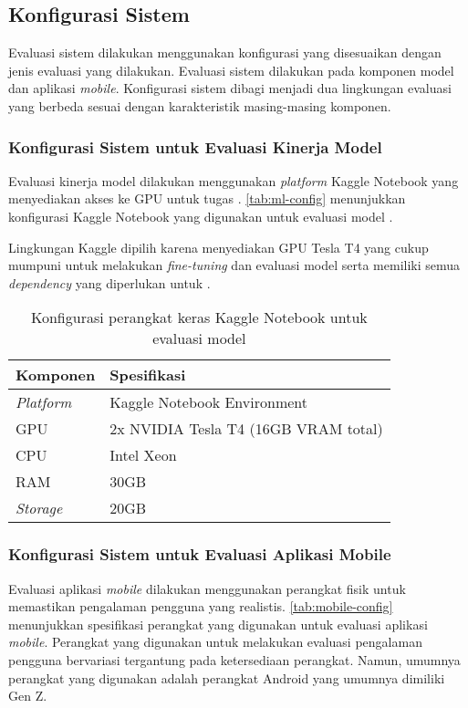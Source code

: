 \subsection{Konfigurasi Sistem}
\label{subsec:konfigurasi-sistem}

Evaluasi sistem dilakukan menggunakan konfigurasi yang disesuaikan dengan jenis evaluasi yang dilakukan. Evaluasi sistem dilakukan pada komponen model \ml{} dan aplikasi \emph{mobile}. Konfigurasi sistem dibagi menjadi dua lingkungan evaluasi yang berbeda sesuai dengan karakteristik masing-masing komponen.

\subsubsection{Konfigurasi Sistem untuk Evaluasi Kinerja Model}
\label{subsubsec:konfigurasi-sistem-evaluasi-kinerja-model}

Evaluasi kinerja model dilakukan menggunakan \emph{platform} Kaggle Notebook yang menyediakan akses ke GPU untuk tugas \ml. \autoref{tab:ml-config} menunjukkan konfigurasi Kaggle Notebook yang digunakan untuk evaluasi model \donut.

Lingkungan Kaggle dipilih karena menyediakan GPU Tesla T4 yang cukup mumpuni untuk melakukan \emph{fine-tuning} dan evaluasi model \donut{} serta memiliki semua \emph{dependency} yang diperlukan untuk \dl.

\begin{table}[h!]
    \centering
    \caption{Konfigurasi perangkat keras Kaggle Notebook untuk evaluasi model}
    \label{tab:ml-config}
    \begin{tabularx}{\textwidth}{|p{4cm}|X|}
        \hline
        \textbf{Komponen} & \textbf{Spesifikasi} \\
        \hline
        \textit{Platform} & Kaggle Notebook Environment \\
        \hline
        GPU      & 2x NVIDIA Tesla T4 (16GB VRAM total) \\
        \hline
        CPU      & Intel Xeon \\
        \hline
        RAM      & 30GB \\
        \hline
        \textit{Storage}  & 20GB \\
        \hline
    \end{tabularx}
\end{table}

\subsubsection{Konfigurasi Sistem untuk Evaluasi Aplikasi Mobile}
\label{subsubsec:konfigurasi-sistem-evaluasi-aplikasi-mobile}
Evaluasi aplikasi \emph{mobile} dilakukan menggunakan perangkat fisik untuk memastikan pengalaman pengguna yang realistis. \autoref{tab:mobile-config} menunjukkan spesifikasi perangkat yang digunakan untuk evaluasi aplikasi \emph{mobile}. Perangkat yang digunakan untuk melakukan evaluasi pengalaman pengguna bervariasi tergantung pada ketersediaan perangkat. Namun, umumnya perangkat yang digunakan adalah perangkat Android yang umumnya dimiliki Gen Z.

